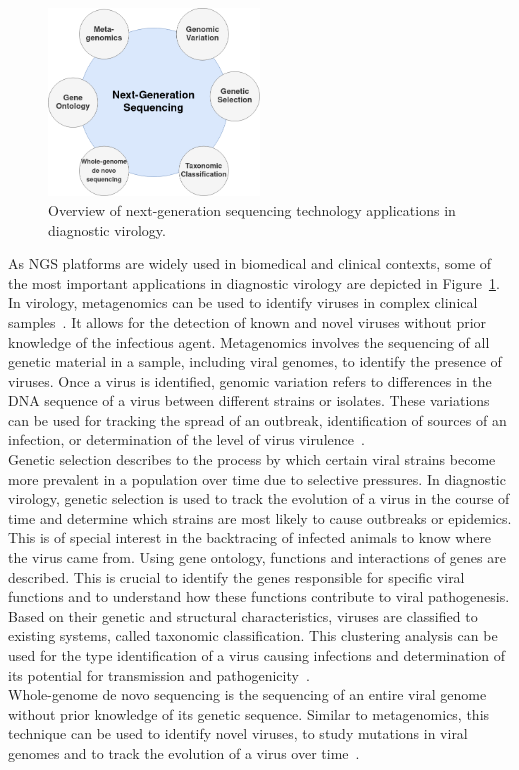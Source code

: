 \begin{figure}
	\centering
	\includegraphics[width=0.5\textwidth]{media/2-ngs.png}
	\caption{Overview of next-generation sequencing technology applications in diagnostic virology.}
	\label{fig:2-ngs}
\end{figure} 

As NGS platforms are widely used in biomedical and clinical contexts, some of the most important applications in diagnostic virology are depicted in Figure~\ref{fig:2-ngs}. In virology, metagenomics can be used to identify viruses in complex clinical samples~\cite{chiu2019clinical}. It allows for the detection of known and novel viruses without prior knowledge of the infectious agent. Metagenomics involves the sequencing of all genetic material in a sample, including viral genomes, to identify the presence of viruses. Once a virus is identified, genomic variation refers to differences in the DNA sequence of a virus between different strains or isolates. These variations can be used for tracking the spread of an outbreak, identification of sources of an infection, or determination of the level of virus virulence~\cite{capobianchi2013next}. \\ 
Genetic selection describes to the process by which certain viral strains become more prevalent in a population over time due to selective pressures. In diagnostic virology, genetic selection is used to track the evolution of a virus in the course of time and determine which strains are most likely to cause outbreaks or epidemics. This is of special interest in the backtracing of infected animals to know where the virus came from. Using gene ontology, functions and interactions of genes are described. This is crucial to identify the genes responsible for specific viral functions and to understand how these functions contribute to viral pathogenesis. \\
Based on their genetic and structural characteristics, viruses are classified to existing systems, called taxonomic classification. This clustering analysis can be used for the type identification of a virus causing infections and determination of its potential for transmission and pathogenicity~\cite{dutilh2021perspective}.\\
Whole-genome de novo sequencing is the sequencing of an entire viral genome without prior knowledge of its genetic sequence. Similar to metagenomics, this technique can be used to identify novel viruses, to study mutations in viral genomes and to track the evolution of a virus over time~\cite{slatko2018overview}.

